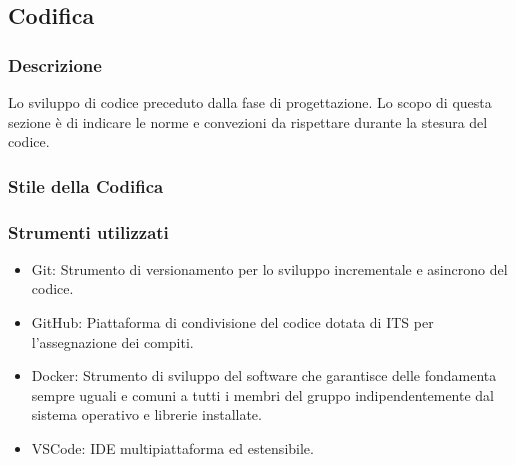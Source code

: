 \subsection{Codifica}

\subsubsection{Descrizione}
Lo sviluppo di codice preceduto dalla fase di progettazione.
Lo scopo di questa sezione è di indicare le norme e convezioni da rispettare durante la stesura del codice.

\subsubsection{Stile della Codifica}

\subsubsection{Strumenti utilizzati}
    \begin{itemize}
    \item Git: Strumento di versionamento per lo sviluppo incrementale e asincrono del codice.
    \item GitHub: Piattaforma di condivisione del codice dotata di ITS per l'assegnazione dei compiti.
    \item Docker: Strumento di sviluppo del software che garantisce delle fondamenta sempre uguali
      e comuni a tutti i membri del gruppo indipendentemente dal sistema operativo e librerie installate.
    \item VSCode: IDE multipiattaforma ed estensibile.
    \end{itemize}
